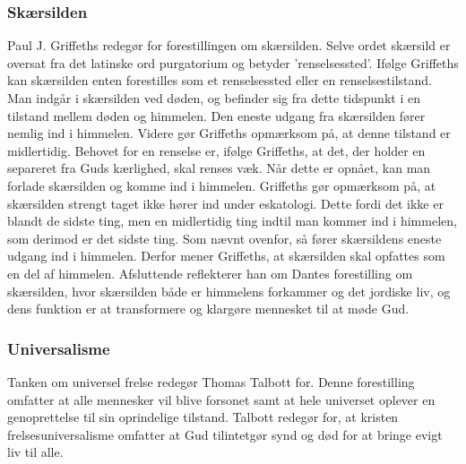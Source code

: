 \subsubsection{Skærsilden}
Paul J. Griffeths redegør for forestillingen om skærsilden. Selve ordet skærsild er oversat fra det latinske ord purgatorium og betyder ’renselsessted’. Ifølge Griffeths kan skærsilden enten forestilles som et renselsessted eller en renselsestilstand. Man indgår i skærsilden ved døden, og befinder sig fra dette tidspunkt i en tilstand mellem døden og himmelen. Den eneste udgang fra skærsilden fører nemlig ind i himmelen. Videre gør Griffeths opmærksom på, at denne tilstand er midlertidig. Behovet for en renselse er, ifølge Griffeths, at det, der holder en separeret fra Guds kærlighed, skal renses væk. Når dette er opnået, kan man forlade skærsilden og komme ind i himmelen. Griffeths gør opmærksom på, at skærsilden strengt taget ikke hører ind under eskatologi. Dette fordi det ikke er blandt de sidste ting, men en midlertidig ting indtil man kommer ind i himmelen, som derimod er det sidste ting. 
Som nævnt ovenfor, så fører skærsildens eneste udgang ind i himmelen. Derfor mener Griffeths, at skærsilden skal opfattes som en del af himmelen. Afsluttende reflekterer han om Dantes forestilling om skærsilden, hvor skærsilden både er himmelens forkammer og det jordiske liv, og dens funktion er at transformere og klargøre mennesket til at møde Gud.

\subsubsection{Universalisme}
Tanken om universel frelse redegør Thomas Talbott for. Denne forestilling omfatter at alle mennesker vil blive forsonet samt at hele universet oplever en genoprettelse til sin oprindelige tilstand. Talbott redegør for, at kristen frelsesuniversalisme omfatter at Gud tilintetgør synd og død for at bringe evigt liv til alle.

